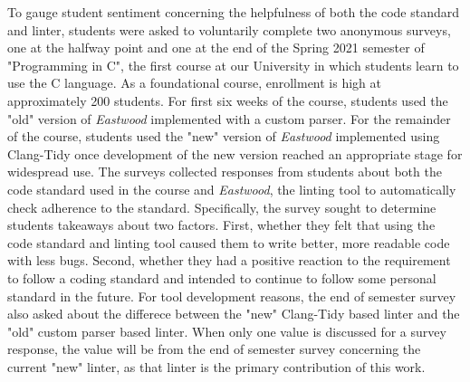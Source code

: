 \documentclass[sigconf]{acmart}
\begin{document}
To gauge student sentiment concerning the helpfulness of both the code standard and
linter, students were asked to voluntarily complete two anonymous surveys, one at the
halfway point and one at the end of the Spring 2021 semester of "Programming in C",
the first course at our University in which students learn to use the C language. As a
foundational course, enrollment is high at approximately 200 students. For first six
weeks of the course, students used the "old" version of \textit{Eastwood} implemented with
a custom parser. For the remainder of the course, students used the "new" version of
\textit{Eastwood} implemented using Clang-Tidy once development of the new version reached
an appropriate stage for widespread use. The surveys collected responses from students
about both the code standard used in the course and \textit{Eastwood}, the linting tool
to automatically check adherence to the standard. Specifically, the survey sought to
determine students takeaways about two factors. First, whether they felt that using the
code standard and linting tool caused them to write better, more readable code with
less bugs. Second, whether they had a positive reaction to the requirement to follow
a coding standard and intended to continue to follow some personal standard in the
future. For tool development reasons, the end of semester survey also asked about
the differece between the "new" Clang-Tidy based linter and the "old" custom parser
based linter. When only one value is discussed for a survey response, the value will
be from the end of semester survey concerning the current "new" linter, as that linter
is the primary contribution of this work.
\\
\end{document}
